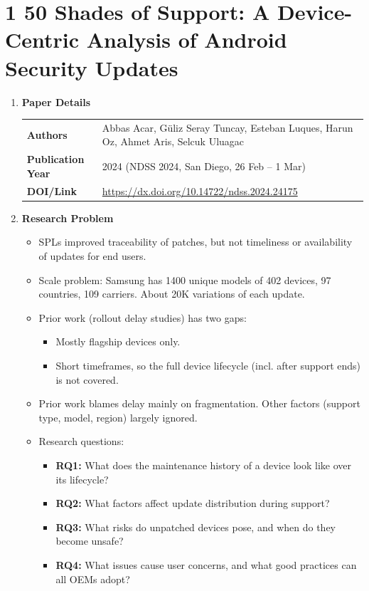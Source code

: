 \documentclass[11pt,a4paper]{article}
\newcommand{\entrypart}[1]{\textbf{\color{accent}#1}\par\vspace{2pt}}
\begin{document}
\section{1 50 Shades of Support: A Device-Centric Analysis of Android Security Updates}

\begin{enumerate}

    \item \entrypart{Paper Details}

    \begin{tabular}{@{}>{\bfseries}p{3.2cm} p{11.5cm}@{}}
        Authors          & Abbas Acar, G\"uliz Seray Tuncay, Esteban Luques, Harun Oz, Ahmet Aris, Selcuk Uluagac \\[2pt]
        Publication Year & 2024 (NDSS 2024, San Diego, 26 Feb -- 1 Mar) \\[2pt]
        DOI/Link         & \url{https://dx.doi.org/10.14722/ndss.2024.24175}
    \end{tabular}

    \item \entrypart{Research Problem}

    \begin{itemize}
        \item SPLs improved traceability of patches, but not timeliness or availability of updates for end users.
        \item Scale problem: Samsung has 1400 unique models of 402 devices, 97 countries, 109 carriers. About 20K variations of each update.
        \item Prior work (rollout delay studies) has two gaps:
        \begin{itemize}
            \item Mostly flagship devices only.
            \item Short timeframes, so the full device lifecycle (incl. after support ends) is not covered.
        \end{itemize}
        \item Prior work blames delay mainly on fragmentation. Other factors (support type, model, region) largely ignored.
        \item Research questions:
        \begin{itemize}
            \item \textbf{RQ1:} What does the maintenance history of a device look like over its lifecycle?
            \item \textbf{RQ2:} What factors affect update distribution during support?
            \item \textbf{RQ3:} What risks do unpatched devices pose, and when do they become unsafe?
            \item \textbf{RQ4:} What issues cause user concerns, and what good practices can all OEMs adopt?
        \end{itemize}
    \end{itemize}


\end{enumerate}
\end{document}
